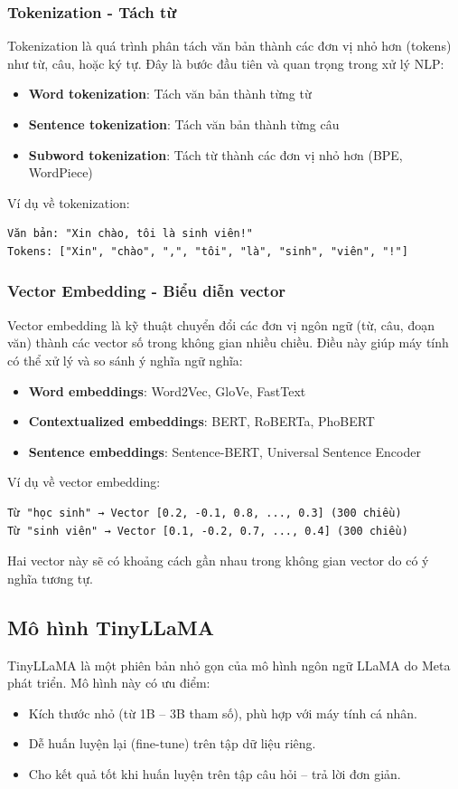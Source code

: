 \documentclass[../DoAn.tex]{subfiles}
\begin{document}
\subsubsection{Tokenization - Tách từ}
Tokenization là quá trình phân tách văn bản thành các đơn vị nhỏ hơn (tokens) như từ, câu, hoặc ký tự. Đây là bước đầu tiên và quan trọng trong xử lý NLP:
\begin{itemize}
    \item \textbf{Word tokenization}: Tách văn bản thành từng từ
    \item \textbf{Sentence tokenization}: Tách văn bản thành từng câu
    \item \textbf{Subword tokenization}: Tách từ thành các đơn vị nhỏ hơn (BPE, WordPiece)
\end{itemize}

Ví dụ về tokenization:
\begin{verbatim}
Văn bản: "Xin chào, tôi là sinh viên!"
Tokens: ["Xin", "chào", ",", "tôi", "là", "sinh", "viên", "!"]
\end{verbatim}

\subsubsection{Vector Embedding - Biểu diễn vector}
Vector embedding là kỹ thuật chuyển đổi các đơn vị ngôn ngữ (từ, câu, đoạn văn) thành các vector số trong không gian nhiều chiều. Điều này giúp máy tính có thể xử lý và so sánh ý nghĩa ngữ nghĩa:
\begin{itemize}
    \item \textbf{Word embeddings}: Word2Vec, GloVe, FastText
    \item \textbf{Contextualized embeddings}: BERT, RoBERTa, PhoBERT
    \item \textbf{Sentence embeddings}: Sentence-BERT, Universal Sentence Encoder
\end{itemize}

Ví dụ về vector embedding:
\begin{verbatim}
Từ "học sinh" → Vector [0.2, -0.1, 0.8, ..., 0.3] (300 chiều)
Từ "sinh viên" → Vector [0.1, -0.2, 0.7, ..., 0.4] (300 chiều)
\end{verbatim}

Hai vector này sẽ có khoảng cách gần nhau trong không gian vector do có ý nghĩa tương tự.

\subsection{Mô hình TinyLLaMA}
TinyLLaMA là một phiên bản nhỏ gọn của mô hình ngôn ngữ LLaMA do Meta phát triển. Mô hình này có ưu điểm:
\begin{itemize}
    \item Kích thước nhỏ (từ 1B – 3B tham số), phù hợp với máy tính cá nhân.
    \item Dễ huấn luyện lại (fine-tune) trên tập dữ liệu riêng.
    \item Cho kết quả tốt khi huấn luyện trên tập câu hỏi – trả lời đơn giản.
\end{itemize}
\end{document}
